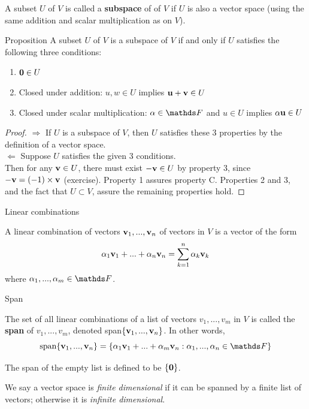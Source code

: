 \documentclass [aspectratio=169]{beamer}
\begin{document}
\begin{frame}

\begin{definition}
A subset $U$ of $V$ is called a \textbf{subspace} of of $V$ if $U$ is also a vector space (using the same addition and scalar multiplication as on $V$).
\end{definition}


\begin{exampleblock}{Proposition}
A subset $U$ of $V$ is a subspace of $V$ if
and only if $U$ satisfies the following three conditions:
\begin{enumerate}
\item  ${\mathbf{0}} \in U$
\item Closed under addition: $u,w\in U$ implies ${\mathbf{u}}+{\mathbf{v}} \in U$
\item Closed under scalar multiplication: $\alpha \in\F$ and $u\in U$
implies $\alpha {\mathbf{u}} \in U$
\end{enumerate}
\end{exampleblock}
\end{frame}

\begin{frame}
\begin{proof}
$\Rightarrow$ If $U$ is a subspace of $V$, then $U$ satisfies these 3 properties by the definition of a vector space. \\
$\Leftarrow$ Suppose $U$ satisfies the given 3 conditions. \\
Then for any ${\mathbf{v}} \in U$, there must exist $-{\mathbf{v}} \in U$ by property 3, since $-{\mathbf{v}} = (-1) \times {\mathbf{v}}$ (exercise). Property 1 assures property C. Properties 2 and 3, and the fact that $U \subset V$, assure the remaining properties hold. 
\end{proof}
\end{frame}

\begin{frame}{Linear combinations}
\begin{definition}
A linear combination of vectors ${\mathbf{v}}_{1},...,{\mathbf{v}}_{n}$ of vectors in $V$ is a vector of the form 
$$
\alpha_{1}{\mathbf{v}}_{1}+...+\alpha_{n}{\mathbf{v}}_{n} = \sum_{k=1}^n \alpha_k {\mathbf{v}}_k
$$
 where $\alpha_{1},...,\alpha_{m} \in \F$.
\end{definition}
\end{frame}

\begin{frame}{Span}
\begin{definition}
The set of all linear combinations of a list of vectors
$v_{1},...,v_{m}$ in $V$ is called the \textbf{span} of $v_{1},...,v_{m}$,
denoted span$\{{\mathbf{v}}_{1},...,{\mathbf{v}}_{n}\}$. In other words, 
$$
\text{span}\{\bv_{1},...,\bv_{n}\}=\{\alpha_{1}\bv_{1}+...+\alpha_{m}\bv_{n} :\alpha_{1},...,\alpha_{n}\in\F\}
$$
\end{definition}
The span of the empty list is defined to be $\{{\mathbf{0}}\}$.

\vspace{1em}
We say a vector space is \emph{finite dimensional} if it can be spanned by a finite list of vectors; otherwise it is \emph{infinite dimensional}.

\end{frame}
\end{document}
